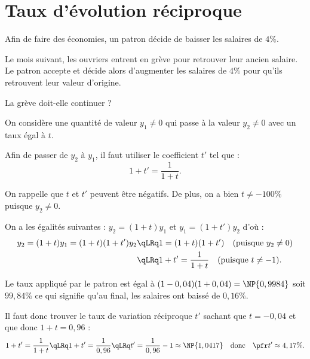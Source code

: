 \documentclass[10pt,openright,twoside,french]{book}
\begin{document}
\section{Taux d'évolution réciproque}

\begin{Exemple}
    Afin de faire des économies, un patron décide de baisser les salaires de $4\%$.\par
    Le mois suivant, les ouvriers entrent en grève pour retrouver leur ancien salaire. Le patron accepte et décide alors d'augmenter les salaires de $4\%$ pour qu'ils retrouvent leur valeur d'origine.\par
    La grève doit-elle continuer ?
\end{Exemple}

\begin{Prop}
    On considère une quantité de valeur $y_1 \neq 0$ qui passe à la valeur $y_2 \neq 0$ avec un taux égal à $t$.\par
    Afin de passer de $y_2$ à $y_1$, il faut utiliser le coefficient $t'$ tel que : \[1 + t' = \frac{1}{1 + t}.\]
\end{Prop}

\begin{Rmq}
    On rappelle que $t$ et $t'$ peuvent être négatifs. De plus, on a bien $t \neq -100\%$ puisque $y_2 \neq 0$.
\end{Rmq}

\begin{Demo}
    On a les égalités suivantes : $y_2 = (1 + t)y_1$ et $y_1 = (1+t')y_2$ d'où :
    \[\begin{split}
        y_2 = (1 + t)y_1 = (1+t)(1+t')y_2 &\qLRq 1 = (1+ t)(1+t') \quad (\text{puisque }y_2 \neq 0)\\
                                                           &\qLRq 1+t' = \frac{1}{1+t} \quad (\text{puisque } t \neq -1).
    \end{split}\]
\end{Demo}

\begin{Exemple}
    Le taux appliqué par le patron est égal à $(1 - 0,04)(1 + 0,04) =  \NP{0,9984}$ soit $99,84\%$ ce qui signifie qu'au final, les salaires ont baissé de $0,16\%$.\par
    Il faut donc trouver le taux de variation réciproque $t'$ sachant que $t = -0,04$ et que donc $1+t = 0,96$ :
    \[1+t' = \frac{1}{1+t} \qLRq 1+t' = \frac{1}{0,96} \qLRq t' = \frac{1}{0,96} - 1 \approx \NP{1,0417} \quad \text{donc} \quad \pfr{t' \approx 4,17\%}.\]
\end{Exemple}
\end{document}
